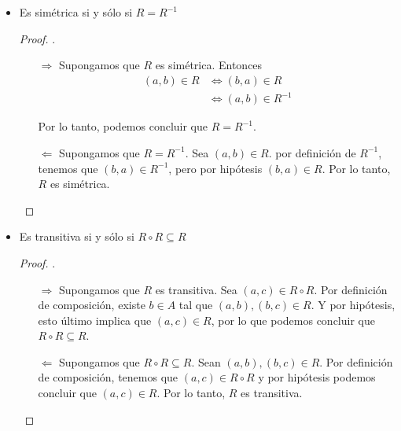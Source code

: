 \documentclass[letterpaper,11pt]{article}
\begin{document}
\begin{enumerate}
\begin{itemize}
        \item Es simétrica si y sólo si $R = R^{-1}$

        \begin{proof} . 
            \begin{itemize}
                \item[$⇒$] Supongamos que $R$ es simétrica. Entonces  
                \begin{align*}
                    (a, b) \in R 
                    &⇔ (b, a) \in R \\ 
                    &⇔ (a, b) \in R^{-1}
                \end{align*}
                
                Por lo tanto, podemos concluir que $R = R^{-1}$.

                \item[$⇐$] Supongamos que $R = R^{-1}$. Sea $(a, b) \in R$.
                por definición de $R^{-1}$, tenemos que $(b, a) \in R^{-1}$, 
                pero por hipótesis $(b, a) \in R$. Por lo tanto, $R$ es 
                simétrica.  
            \end{itemize}
        \end{proof}

        \item Es transitiva si y sólo si $R ∘ R ⊆ R$
        
        \begin{proof} .
            \begin{itemize}
                \item[$⇒$] Supongamos que $R$ es transitiva. Sea 
                $(a, c) \in R ∘ R$. Por definición de composición, existe 
                $b \in A$ tal que $(a, b), (b, c) \in R$. Y por hipótesis,
                esto último implica que $(a, c) \in R$, por lo que podemos 
                concluir que $R ∘ R ⊆ R$.

                \item[$⇐$] Supongamos que $R ∘ R ⊆ R$. Sean 
                $(a, b), (b, c) \in R$. Por definición de composición, tenemos 
                que $(a, c) \in R ∘ R$ y por hipótesis podemos concluir que 
                $(a, c) \in R$. Por lo tanto, $R$ es transitiva. 
            \end{itemize}
        \end{proof}
    \end{itemize}


\end{enumerate}
\end{document}
